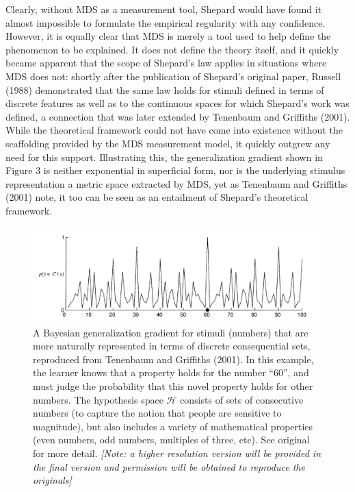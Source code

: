 \documentclass[english,doc]{apa6}
\begin{document}
Clearly, without MDS as a measurement tool, Shepard would have found it almost impossible to formulate the empirical regularity with any confidence. However, it is equally clear that MDS is merely a tool used to help define the phenomenon to be explained. It does not define the theory itself, and it quickly became apparent that the scope of Shepard's law applies in situations where MDS does not: shortly after the publication of Shepard's original paper, Russell (1988) demonstrated that the same law holds for stimuli defined in terms of discrete features as well as to the continuous spaces for which Shepard's work was defined, a connection that was later extended by Tenenbaum and Griffiths (2001). While the theoretical framework could not have come into existence without the scaffolding provided by the MDS measurement model, it quickly outgrew any need for this support. Illustrating this, the generalization gradient shown in Figure 3 is neither exponential in superficial form, nor is the underlying stimulus representation a metric space extracted by MDS, yet as Tenenbaum and Griffiths (2001) note, it too can be seen as an entailment of Shepard's theoretical framework.



\begin{figure}[t]
\includegraphics[width=4.58in]{tenenbaum_figure5} \caption{A Bayesian generalization gradient for stimuli (numbers) that are more naturally represented in terms of discrete consequential sets, reproduced from Tenenbaum and Griffiths (2001). In this example, the learner knows that a property holds for the number ``60'', and must judge the probability that this novel property holds for other numbers. The hypothesis space \(\mathcal{H}\) consists of sets of consecutive numbers (to capture the notion that people are sensitive to magnitude), but also includes a variety of mathematical properties (even numbers, odd numbers, multiples of three, etc). See original for more detail. \emph{{[}Note: a higher resolution version will be provided in the final version and permission will be obtained to reproduce the originals{]}}}\label{fig:unnamed-chunk-3}
\end{figure}
\end{document}
